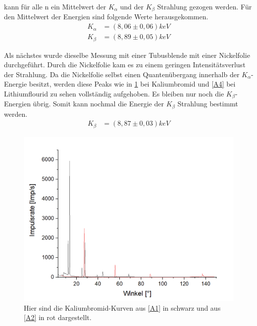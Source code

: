 \documentclass[
	a4paper,
	12pt,
	pagesize,
	ngerman
]{scrartcl}
\begin{document}
kann für alle n ein Mittelwert der $K_{\alpha}$ und der $K_{\beta}$ Strahlung gezogen werden. Für den Mittelwert der Energien sind folgende Werte herausgekommen.
\begin{align*}
    K_{\alpha} &= (8,06 \pm 0,06) keV \\
    K_{\beta} &= (8,89 \pm 0,05) keV
\end{align*}

Als nächstes wurde dieselbe Messung mit einer Tubusblende mit einer Nickelfolie durchgeführt. Durch die Nickelfolie kam es zu einem geringen Intensitätsverlust der Strahlung. Da die Nickelfolie selbst einen Quantenübergang innerhalb der $K_{\alpha}$-Energie besitzt, werden diese Peaks wie in \cref{A3} bei Kaliumbromid und \cref{A4} bei Lithiumflourid zu sehen vollständig aufgehoben. Es bleiben nur noch die $K_{\beta}$-Energien übrig.
Somit kann nochmal die Energie der $K_{\beta}$ Strahlung bestimmt werden. 
\begin{align*}
    K_{\beta} &= (8,87 \pm 0,03)keV
\end{align*}
\begin{figure}[h!]
    \centering
    \includegraphics[scale = 0.6]{mono-normal.png}
    \caption{Hier sind die Kaliumbromid-Kurven aus \cref{A1} in schwarz und aus \cref{A2} in rot dargestellt.}
    \label{A3}
\end{figure}
\end{document}
